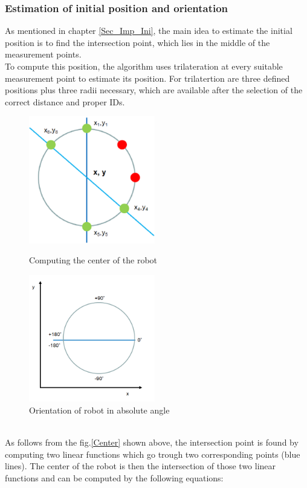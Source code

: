 \subsubsection{Estimation of initial position and orientation}
As mentioned in chapter \ref{Sec_Imp_Ini}, the main idea to estimate the initial position is to find the intersection point, which lies in the middle of the measurement points.\\
To compute this position, the algorithm uses trilateration at every suitable measurement point to estimate its position. For trilatertion are three defined positions plus three radii necessary, which are available after the selection of the correct distance and proper IDs.\\
\begin{figure}[!htbp]
\centering
\begin{minipage}{.5\textwidth}
\centering
\includegraphics[width=5.5cm]{Pictures/Center_Rob} %
\caption{Computing the center of the robot}
\label{Center}
\end{minipage}%
\begin{minipage}{.5\textwidth}
\centering
\includegraphics[width=5.5cm]{Pictures/Orientation} %
\caption{Orientation of robot in absolute angle}
\label{Angle}
\end{minipage}
\end{figure}\\
As follows from the fig.\ref{Center} shown above, the intersection point is found by computing two linear functions which go trough two corresponding points (blue lines). The center of the robot is then the intersection of those two linear functions and can be computed by the following equations:
